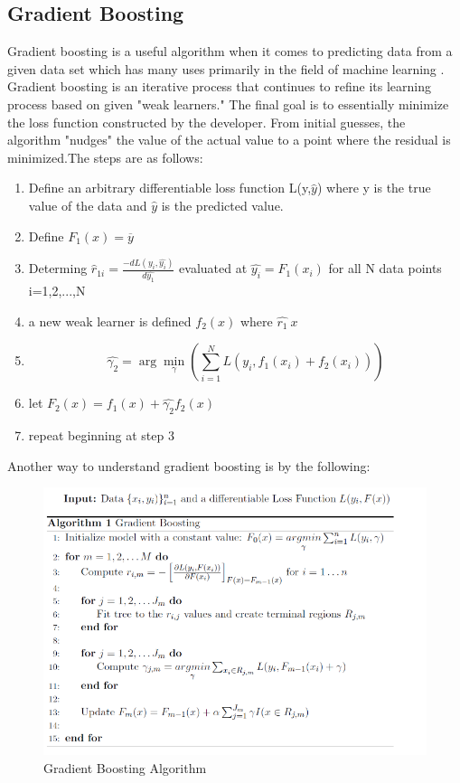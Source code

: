 \documentclass[12pt]{article}
\begin{document}
\subsection{Gradient Boosting}
Gradient boosting is a useful algorithm when it comes to predicting data from a given data set which has many uses primarily in the field of machine learning \cite{mora-gradient-boosting}. Gradient boosting is an iterative process that continues to refine its learning process based on given "weak learners." The final goal is to essentially minimize the loss function constructed by the developer. From initial guesses, the algorithm "nudges" the value of the actual value to a point where the residual is minimized.The steps are as follows:
\begin{enumerate}
    \item Define an arbitrary differentiable loss function L(y,$\hat{y}$) where y is the true value of the data and $\hat{y}$ is the predicted value.
    \item Define $F_1(x)=\overline{y}$
    \item Determing $\hat{r}_{1i}=\frac{-dL(y_i,\hat{y_i})}{d\hat{y_1}}$ evaluated at $\hat{y_i}=F_1(x_i)$ for all N data points i=1,2,...,N
    \item a new weak learner is defined $f_2(x)$ where $\hat{r_1}~x$
    \item \[\hat{\gamma_2}=\arg\min_{\gamma}(\sum_{i=1}^{N}L(y_i,f_1(x_i)+f_2(x_i)))\]
    \item let $F_2(x)=f_1(x)+\hat{\gamma_2}f_2(x)$
    \item repeat beginning at step 3
\end{enumerate}
Another way to understand gradient boosting is by the following: 
 \begin{figure}[H]
    \centering
    \includegraphics[width=15cm]{GBoost.png}
    \caption{Gradient Boosting Algorithm}
    \label{fig:grad-boost}
\end{figure}
\end{document}
